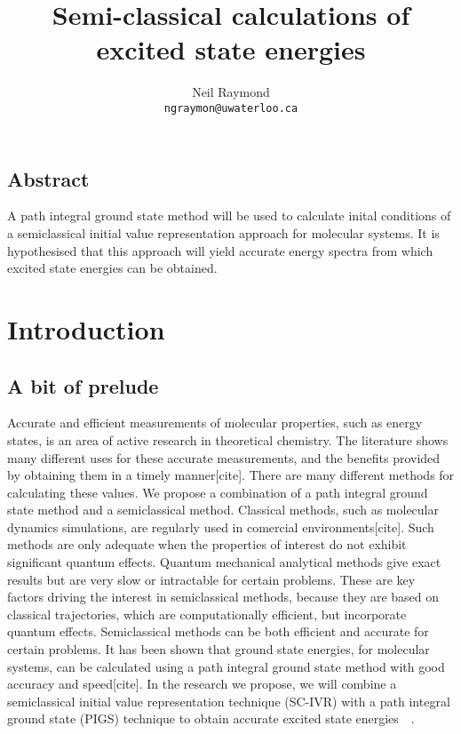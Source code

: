 \documentclass[12pt,letterpaper,oneside,final,titlepage]{article}               %
\numberwithin{equation}{section} %
\begin{document}
    \title{Semi-classical calculations of excited state energies}
    \author{Neil Raymond
           \\ \texttt{ngraymon@uwaterloo.ca}}
    \date{}
    \maketitle

\doublespacing

\subsection*{Abstract}
A path integral ground state method will be used to calculate inital conditions of a semiclassical initial value representation approach for molecular systems. 
It is hypothesised that this approach will yield accurate energy spectra from which excited state energies can be obtained. 

\section{Introduction}

\subsection{A bit of prelude}
Accurate and efficient measurements of molecular properties, such as energy states, is an area of active research in theoretical chemistry. 
The literature shows many different uses for these accurate measurements, and the benefits provided by obtaining them in a timely manner[cite]. 
There are many different methods for calculating these values. 
We propose a combination of a path integral ground state method and a semiclassical method. 
Classical methods, such as molecular dynamics simulations, are regularly used in comercial environments[cite]. 
Such methods are only adequate when the properties of interest do not exhibit significant quantum effects. 
Quantum mechanical analytical methods give exact results but are very slow or intractable for certain problems. 
These are key factors driving the interest in semiclassical methods, because they are based on classical trajectories, 
which are computationally efficient, but incorporate quantum effects. 
Semiclassical methods can be both efficient and accurate for certain problems. 
It has been shown that ground state energies, for molecular systems, can be calculated using a path integral ground state method with good accuracy and speed[cite]. 
In the research we propose, we will combine a semiclassical initial value representation technique (SC-IVR) with a path integral 
ground state (PIGS) technique to obtain accurate excited state energies~\cite{issack2007semiclassical}~\cite{schmidt2014inclusion}.
\end{document}
